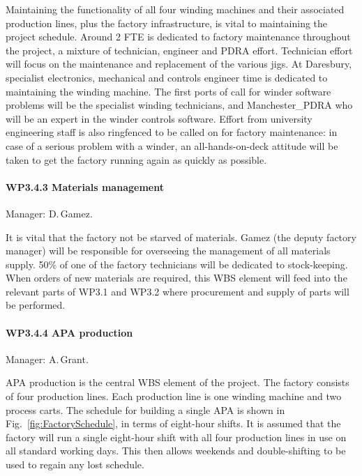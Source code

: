 Maintaining the functionality of all four winding machines and their associated production lines, plus the factory infrastructure, is vital to maintaining the project schedule. Around 2 FTE is dedicated to factory maintenance throughout the project, a mixture of technician, engineer and PDRA effort. Technician effort will focus on the maintenance and replacement of the various jigs. At Daresbury, specialist electronics, mechanical and controls engineer time is dedicated to maintaining the winding machine. The first ports of call for winder software problems will be the specialist winding technicians, and Manchester\_PDRA who will be an expert in the winder controls software. Effort from university engineering staff is also ringfenced to be called on for factory maintenance: in case of a serious problem with a winder, an all-hands-on-deck attitude will be taken to get the factory running again as quickly as possible.

\paragraph{WP3.4.3 Materials management} Manager: D.\,Gamez.

It is vital that the factory not be starved of materials. Gamez (the deputy factory manager) will be responsible for overseeing the management of all materials supply. 50\% of one of the factory technicians will be dedicated to stock-keeping. When orders of new materials are required, this WBS element will feed into the relevant parts of WP3.1 and WP3.2 where procurement and supply of parts will be performed. 

\paragraph{WP3.4.4 APA production} Manager: A.\,Grant.

APA production is the central WBS element of the project. The factory consists of four production lines. Each production line is one winding machine and two process carts. The schedule for building a single APA is shown in Fig.~\ref{fig:FactorySchedule}, in terms of eight-hour shifts. It is assumed that the factory will run a single eight-hour shift with all four production lines in use on all standard working days. This then allows weekends and double-shifting to be used to regain any lost schedule.

